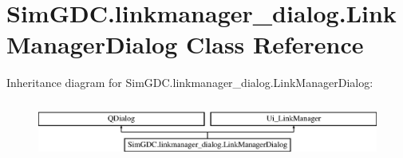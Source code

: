 \hypertarget{class_sim_g_d_c_1_1linkmanager__dialog_1_1_link_manager_dialog}{}\section{Sim\+G\+D\+C.\+linkmanager\+\_\+dialog.\+Link\+Manager\+Dialog Class Reference}
\label{class_sim_g_d_c_1_1linkmanager__dialog_1_1_link_manager_dialog}
Inheritance diagram for Sim\+G\+D\+C.\+linkmanager\+\_\+dialog.\+Link\+Manager\+Dialog\+:\begin{figure}[H]
\begin{center}
\leavevmode
\includegraphics[height=1.904762cm]{class_sim_g_d_c_1_1linkmanager__dialog_1_1_link_manager_dialog}
\end{center}
\end{figure}
